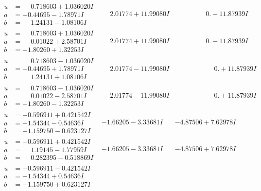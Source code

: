 \documentclass[1p]{elsarticle_modified}
\theoremstyle{definition}
\begin{document}
$$\begin{array}{c|c|c}
\begin{aligned}
u &= \phantom{-}0.718603 + 1.036020 I \\
a &= -0.44695 - 1.78971 I \\
b &= \phantom{-}1.24131 - 1.08106 I\end{aligned}
 & \phantom{-}2.01774 + 11.99080 I & \phantom{-0.000000 } 0. - 11.87939 I \\ \hline\begin{aligned}
u &= \phantom{-}0.718603 + 1.036020 I \\
a &= \phantom{-}0.01022 + 2.58701 I \\
b &= -1.80260 + 1.32253 I\end{aligned}
 & \phantom{-}2.01774 + 11.99080 I & \phantom{-0.000000 } 0. - 11.87939 I \\ \hline\begin{aligned}
u &= \phantom{-}0.718603 - 1.036020 I \\
a &= -0.44695 + 1.78971 I \\
b &= \phantom{-}1.24131 + 1.08106 I\end{aligned}
 & \phantom{-}2.01774 - 11.99080 I & \phantom{-0.000000 -}0. + 11.87939 I \\ \hline\begin{aligned}
u &= \phantom{-}0.718603 - 1.036020 I \\
a &= \phantom{-}0.01022 - 2.58701 I \\
b &= -1.80260 - 1.32253 I\end{aligned}
 & \phantom{-}2.01774 - 11.99080 I & \phantom{-0.000000 -}0. + 11.87939 I \\ \hline\begin{aligned}
u &= -0.596911 + 0.421542 I \\
a &= -1.54344 - 0.54636 I \\
b &= -1.159750 - 0.623127 I\end{aligned}
 & -1.66205 - 3.33681 I & -4.87506 + 7.62978 I \\ \hline\begin{aligned}
u &= -0.596911 + 0.421542 I \\
a &= \phantom{-}1.19145 - 1.77959 I \\
b &= \phantom{-}0.282395 - 0.518869 I\end{aligned}
 & -1.66205 - 3.33681 I & -4.87506 + 7.62978 I \\ \hline\begin{aligned}
u &= -0.596911 - 0.421542 I \\
a &= -1.54344 + 0.54636 I \\
b &= -1.159750 + 0.623127 I\end{aligned}

\end{array}$$
\end{document}
